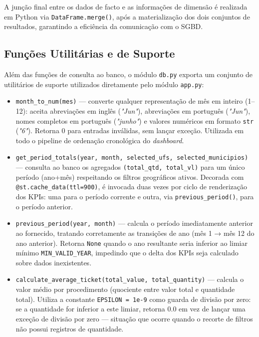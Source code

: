 \documentclass[12pt,a4paper]{report}
\begin{document}
A junção final entre os dados de facto e as informações de dimensão é realizada em
Python via \texttt{DataFrame.merge()}, após a materialização dos dois conjuntos de
resultados, garantindo a eficiência da comunicação com o SGBD.

\subsection{Funções Utilitárias e de Suporte}

Além das funções de consulta ao banco, o módulo \texttt{db.py} exporta um conjunto
de utilitários de suporte utilizados diretamente pelo módulo \texttt{app.py}:

\begin{itemize}
    \item \texttt{month\_to\_num(mes)} — converte qualquer representação de mês em
    inteiro (1--12): aceita abreviações em inglês (\textit{"Jun"}), abreviações em
    português (\textit{"Jun"}), nomes completos em português (\textit{"junho"}) e
    valores numéricos em formato \texttt{str} (\textit{"6"}). Retorna 0 para entradas
    inválidas, sem lançar exceção. Utilizada em todo o pipeline de ordenação
    cronológica do \textit{dashboard}.

    \item \texttt{get\_period\_totals(year, month, selected\_ufs, selected\_municipios)}
    — consulta ao banco os agregados \texttt{(total\_qtd, total\_vl)} para um único
    período (ano+mês) respeitando os filtros geográficos ativos. Decorada com
    \texttt{@st.cache\_data(ttl=900)}, é invocada duas vezes por ciclo de renderização
    dos KPIs: uma para o período corrente e outra, via \texttt{previous\_period()},
    para o período anterior.

    \item \texttt{previous\_period(year, month)} — calcula o período imediatamente
    anterior ao fornecido, tratando corretamente as transições de ano (mês 1 → mês 12
    do ano anterior). Retorna \texttt{None} quando o ano resultante seria inferior ao
    limiar mínimo \texttt{MIN\_VALID\_YEAR}, impedindo que o delta dos KPIs seja
    calculado sobre dados inexistentes.

    \item \texttt{calculate\_average\_ticket(total\_value, total\_quantity)} — calcula
    o valor médio por procedimento (quociente entre valor total e quantidade total).
    Utiliza a constante \texttt{EPSILON = 1e-9} como guarda de divisão por zero: se
    a quantidade for inferior a este limiar, retorna 0.0 em vez de lançar uma exceção
    de divisão por zero — situação que ocorre quando o recorte de filtros não possui
    registros de quantidade.
\end{itemize}
\end{document}
